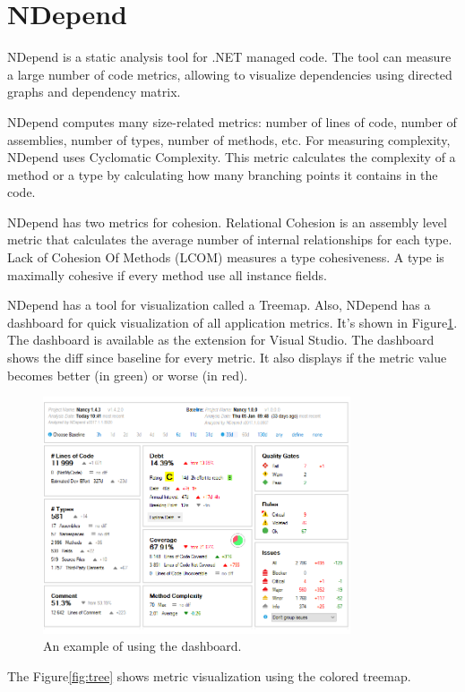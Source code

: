 \section{NDepend}

NDepend is a static analysis tool for .NET managed code. The tool can measure a large number of code metrics, allowing to visualize dependencies using directed graphs and dependency matrix.  

NDepend computes many size-related metrics: number of lines of code, number of assemblies, number of types, number of methods, etc. For measuring complexity, NDepend uses Cyclomatic Complexity. This metric calculates the complexity of a method or a type by calculating how many branching points it contains in the code.

NDepend has two metrics for cohesion. Relational Cohesion is an assembly level metric that calculates the average number of internal relationships for each type. Lack of Cohesion Of Methods (LCOM) measures a type cohesiveness. A type is maximally cohesive if every method use all instance fields.

NDepend has a tool for visualization called a Treemap. Also, NDepend has a dashboard for quick visualization of all application metrics. It's shown in Figure\ref{fig:dash}. The dashboard is available as the extension for Visual Studio. The dashboard shows the diff since baseline for every metric. It also displays if the metric value becomes better (in green) or worse (in red). 

\begin{figure}[h]
	\centering
	\includegraphics[height=70mm]{figures/dash.png}
	\caption{An example of using the dashboard.}
	\label{fig:dash}
\end{figure}

The Figure\ref{fig:tree} shows metric visualization using the colored treemap.

